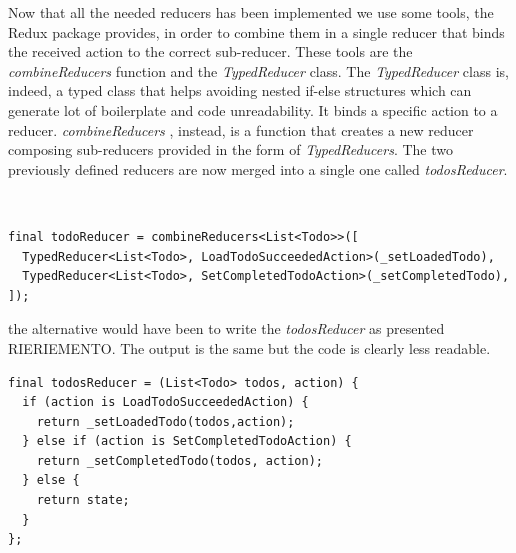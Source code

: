 Now that all the needed reducers has been implemented we  use some tools, the Redux package provides, in order to combine them in a single reducer that binds the received action to the correct sub-reducer. These tools are the \textit{combineReducers} function and the \textit{TypedReducer} class. The \textit{TypedReducer} class is, indeed, a typed class that helps avoiding nested if-else structures which can generate lot of boilerplate and code unreadability. It binds a specific action to a reducer. \textit{combineReducers} , instead, is a function that creates a new reducer composing sub-reducers provided in the form of \textit{TypedReducers}. The two previously defined reducers are now merged into a single one called \textit{todosReducer}.
\begin{code}
\mbox{}\\
 \mbox{}
		\label{code:2.14}
\begin{verbatim}
final todoReducer = combineReducers<List<Todo>>([
  TypedReducer<List<Todo>, LoadTodoSucceededAction>(_setLoadedTodo),
  TypedReducer<List<Todo>, SetCompletedTodoAction>(_setCompletedTodo),
]);
\end{verbatim}
\mbox{}
\end{code}

the alternative would have been to write the \textit{todosReducer} as presented RIERIEMENTO. The output is the same but the code is clearly less readable.
\begin{code}
\mbox{}
 \mbox{}
		\label{code:2.14}
\begin{verbatim}
final todosReducer = (List<Todo> todos, action) {
  if (action is LoadTodoSucceededAction) {
    return _setLoadedTodo(todos,action);
  } else if (action is SetCompletedTodoAction) {
    return _setCompletedTodo(todos, action);
  } else {
    return state;
  }
};
\end{verbatim}
\mbox{}
\end{code}

